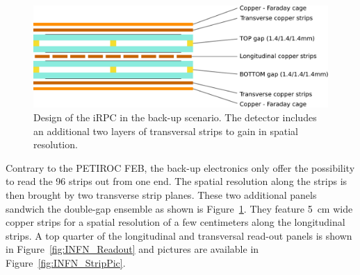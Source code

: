 	\begin{figure}[H]
		\centering
		\includegraphics[width = 0.8\linewidth]{fig/chapt6/iRPC-INFN-Design.pdf}
		\caption{\label{fig:INFN-Design} Design of the iRPC in the back-up scenario. The detector includes an additional two layers of transversal strips to gain in spatial resolution.}
    \end{figure}
	
	Contrary to the PETIROC FEB, the back-up electronics only offer the possibility to read the 96 strips out from one end. The spatial resolution along the strips is then brought by two transverse strip planes. These two additional panels sandwich the double-gap ensemble as shown is Figure~\ref{fig:INFN-Design}. They feature \SI{5}{cm} wide copper strips for a spatial resolution of a few centimeters along the longitudinal strips. A top quarter of the longitudinal and transversal read-out panels is shown in Figure~\ref{fig:INFN_Readout} and pictures are available in Figure~\ref{fig:INFN_StripPic}.
	 
